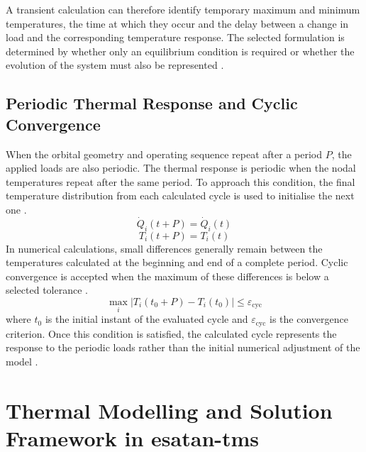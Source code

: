 A transient calculation can therefore identify temporary maximum and minimum temperatures, 
the time at which they occur and the delay between a change in load and the corresponding 
temperature response. The selected formulation is determined by whether only an equilibrium 
condition is required or whether the evolution of the system must also be represented 
\cite{th_handbook,ecss_man}.

\subsection{Periodic Thermal Response and Cyclic Convergence}

When the orbital geometry and operating sequence repeat after a period $P$, the applied 
loads are also periodic. The thermal response is periodic when the nodal temperatures 
repeat after the same period. To approach this condition, the final temperature 
distribution from each calculated cycle is used to initialise the next one 
\cite{spacethctrl,gaite2012linear,esatan_training_man}.
\begin{equation}
    \dot{Q}_{i}(t+P) = \dot{Q}_{i}(t)
    \label{eq:periodic_heat_load}
\end{equation}
\begin{equation}
    T_{i}(t+P) = T_{i}(t)
    \label{eq:periodic_temperature}
\end{equation}
In numerical calculations, small differences generally remain between the temperatures 
calculated at the beginning and end of a complete period. Cyclic convergence is accepted 
when the maximum of these differences is below a selected tolerance 
\cite{thermal_eng_man,esatan_training_man}.
\begin{equation}
    \max_i
    \left|
    T_{i}(t_{0}+P)-T_{i}(t_{0})
    \right|
    \leq
    \varepsilon_{\mathrm{cyc}}
    \label{eq:cyclic_convergence}
\end{equation}
where $t_0$ is the initial instant of the evaluated cycle and
$\varepsilon_{\mathrm{cyc}}$ is the convergence criterion. Once this condition is 
satisfied, the calculated cycle represents the response to the periodic loads rather 
than the initial numerical adjustment of the model 
\cite{gaite2012linear,thermal_eng_man,esatan_training_man}.

\section{
    \texorpdfstring
    {Thermal Modelling and Solution Framework in \acrshort{esatan-tms}}
    {Thermal Modelling and Solution Framework in ESATAN-TMS}
}

